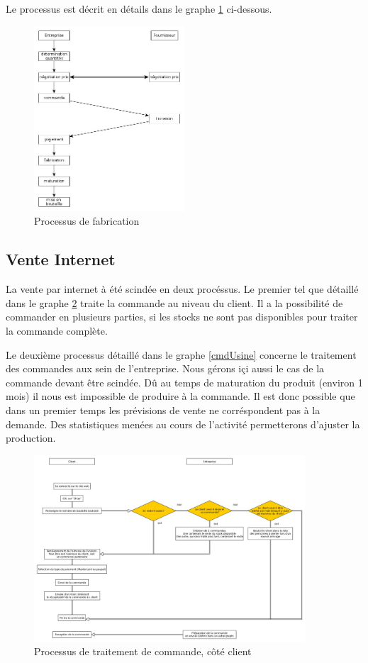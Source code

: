 \documentclass[10pt,a4paper]{article}
\begin{document}
Le processus est décrit en détails dans le graphe \ref{prod} ci-dessous.

\begin{figure}[h!]
\centering
\includegraphics[width=0.5\textwidth]{../flowchart/prod.jpg}
\caption{Processus de fabrication}
\label{prod}
\end{figure}
\subsection{Vente Internet}
La vente par internet à été scindée en deux procéssus.
Le premier tel que détaillé dans le graphe \ref{cmdInternet} traite la commande au niveau du client.
Il a la possibilité de commander en plusieurs parties, si les stocks ne sont pas disponibles pour traiter la commande complète.

Le deuxième processus détaillé dans le graphe \ref{cmdUsine} concerne le traitement des commandes aux sein de l'entreprise.
Nous gérons içi aussi le cas de la commande devant être scindée.
Dû au temps de maturation du produit (environ 1 mois) il nous est impossible de produire à la commande.
Il est donc possible que dans un premier temps les prévisions de vente ne corréspondent pas à la demande.
Des statistiques menées au cours de l'activité permetterons d'ajuster la production.
\begin{figure}[h!]
\centering
\includegraphics[width=0.9\textwidth]{../flowchart/commandeInternet.jpg}
\caption{Processus de traitement de commande, côté client}
\label{cmdInternet}
\end{figure}
\end{document}
